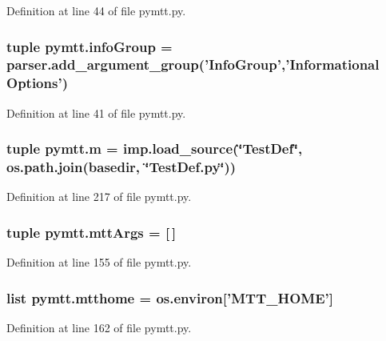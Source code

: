 Definition at line 44 of file pymtt.\-py.

\hypertarget{namespacepymtt_a99ad2929ecc4e17f97670bed44f08c35}{
\subsubsection[{info\-Group}]{\setlength{\rightskip}{0pt plus 5cm}tuple pymtt.\-info\-Group = parser.\-add\-\_\-argument\-\_\-group('Info\-Group','Informational Options')}}\label{namespacepymtt_a99ad2929ecc4e17f97670bed44f08c35}


Definition at line 41 of file pymtt.\-py.

\hypertarget{namespacepymtt_ab13a60c31fa69917ce06c1a2631aaf02}{
\subsubsection[{m}]{\setlength{\rightskip}{0pt plus 5cm}tuple pymtt.\-m = imp.\-load\-\_\-source(\char`\"{}Test\-Def\char`\"{}, os.\-path.\-join({\bf basedir}, \char`\"{}Test\-Def.\-py\char`\"{}))}}\label{namespacepymtt_ab13a60c31fa69917ce06c1a2631aaf02}


Definition at line 217 of file pymtt.\-py.

\hypertarget{namespacepymtt_a7dea31bd26744bab0b1c30dc11c718aa}{
\subsubsection[{mtt\-Args}]{\setlength{\rightskip}{0pt plus 5cm}tuple pymtt.\-mtt\-Args = \mbox{[}$\,$\mbox{]}}}\label{namespacepymtt_a7dea31bd26744bab0b1c30dc11c718aa}


Definition at line 155 of file pymtt.\-py.

\hypertarget{namespacepymtt_a109ef76f074b08666398bf6a38219cfc}{
\subsubsection[{mtthome}]{\setlength{\rightskip}{0pt plus 5cm}list pymtt.\-mtthome = os.\-environ\mbox{[}'M\-T\-T\-\_\-\-H\-O\-M\-E'\mbox{]}}}\label{namespacepymtt_a109ef76f074b08666398bf6a38219cfc}


Definition at line 162 of file pymtt.\-py.

